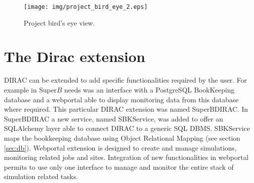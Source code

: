 \documentclass[a4paper]{jpconf}
\begin{document}
\begin{figure}[h]
\texttt{[image: img/project\_bird\_eye\_2.eps]}\hspace{2pc}%
\begin{minipage}[b]{8pc}\caption{\label{fig:project_bird_eye}Project bird's eye view.}
\end{minipage}
\end{figure}

 
\section{The Dirac extension} 
DIRAC can be extended to add specific functionalities required by the user. For example in Super$B$\cite{ref:superb_tdr} needs was an interface with a PostgreSQL BookKeeping database and a webportal able to display monitoring data from this database where required. This particular DIRAC extension was named SuperBDIRAC.
In SuperBDIRAC a new service, named SBKService, was added to offer an SQLAlchemy layer able to connect DIRAC to a generic SQL DBMS. SBKService maps the bookkeeping database using Object Relational Mapping (see section \ref{sec:db}). 
Webportal extension is designed to create and manage simulations, monitoring related jobs and sites. Integration of new functionalities in webportal permits to use only one interface to manage and monitor the entire stack of simulation related tasks.
\end{document}
